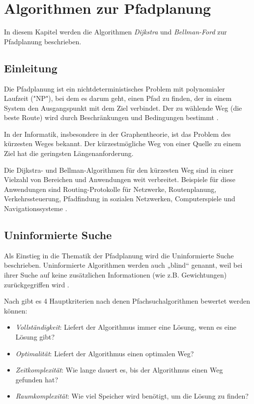 \chapter{Algorithmen zur Pfadplanung}
In diesem Kapitel werden die Algorithmen \emph{Dijkstra} und \emph{Bellman-Ford} zur Pfadplanung beschrieben.

\section{Einleitung}
\label{Einleitung}
Die Pfadplanung ist ein nichtdeterministisches Problem mit polynomialer Laufzeit ("NP"), bei dem es darum geht, einen Pfad zu finden, 
der in einem System den Ausgangspunkt mit dem Ziel verbindet. Der zu wählende Weg (die beste Route) wird durch Beschränkungen 
und Bedingungen bestimmt \cite{Karur:21}.

In der Informatik, insbesondere in der Graphentheorie, ist das Problem des kürzesten Weges bekannt. Der kürzestmögliche Weg von einer Quelle zu einem Ziel hat die geringsten Längenanforderung.

Die Dijkstra- und Bellman-Algorithmen für den kürzesten Weg sind in einer Vielzahl von Bereichen und Anwendungen
weit verbreitet. Beispiele für diese Anwendungen sind Routing-Protokolle für Netzwerke, Routenplanung, 
Verkehrssteuerung, Pfadfindung in sozialen Netzwerken, Computerspiele und Navigationssysteme \cite{Panda:18}.

\section{Uninformierte Suche}
\label{Uninformierte Suche}
Als Einstieg in die Thematik der Pfadplanung wird die Uninformierte Suche beschrieben.
Uninformierte Algorithmen werden auch „blind“ genannt, weil bei ihrer 
Suche auf keine zusätzlichen Informationen (wie z.B. Gewichtungen) zurückgegriffen wird \cite[80-82]{Russell:10}.

Nach \cite[80-82]{Russell:10} gibt es 4 Hauptkriterien nach denen Pfachsuchalgorithmen bewertet werden können:
\begin{itemize}
	\item \emph{Vollständigkeit}: Liefert der Algorithmus immer eine Lösung, wenn es eine Lösung gibt?
	\item \emph{Optimalität}: Liefert der Algorithmus einen optimalen Weg?
	\item \emph{Zeitkomplexität}: Wie lange dauert es, bis der Algorithmus einen Weg gefunden hat?
	\item \emph{Raumkomplexität}: Wie viel Speicher wird benötigt, um die Lösung zu finden?
\end{itemize}
\newpage
